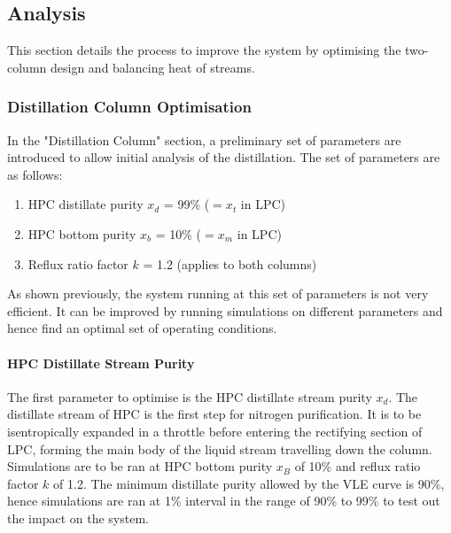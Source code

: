 \documentclass[11pt,oneside]{article}
\let\subsubsubsection\paragraph
\begin{document}
\subsection{Analysis} \noindent
This section details the process to improve the system by optimising the two-column design and balancing heat of streams.
	\subsubsection{Distillation Column Optimisation} \noindent
	In the "Distillation Column" section, a preliminary set of parameters are introduced to allow initial analysis of the distillation. The set of parameters are as follows:
    \begin{enumerate}
        \item HPC distillate purity $x_d$ = 99\% ($=x_t$ in LPC)
        \item HPC bottom purity $x_b$ = 10\% ($=x_m$ in LPC)
        \item Reflux ratio factor $k$ = 1.2 (applies to both columns)
    \end{enumerate}
    As shown previously, the system running at this set of parameters is not very efficient. It can be improved by running simulations on different parameters and hence find an optimal set of operating conditions.
    \subsubsubsection{HPC Distillate Stream Purity}
    The first parameter to optimise is the HPC distillate stream purity $x_d$. The distillate stream of HPC is the first step for nitrogen purification. It is to be isentropically expanded in a throttle before entering the rectifying section of LPC, forming the main body of the liquid stream travelling down the column. \\
    Simulations are to be ran at HPC bottom purity $x_B$ of 10\% and reflux ratio factor $k$ of 1.2. The minimum distillate purity allowed by the VLE curve is 90\%, hence simulations are ran at 1\% interval in the range of 90\% to 99\% to test out the impact on the system. \\
    
\end{document}
